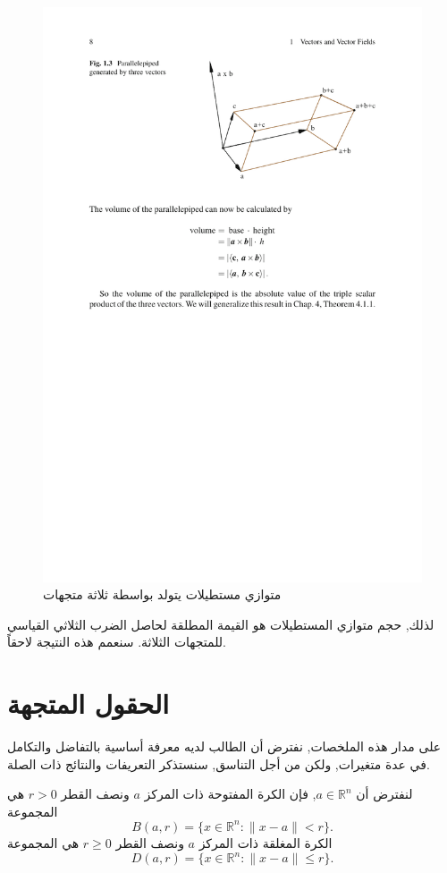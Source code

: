 \begin{figure}
    \centering
    \includegraphics[width=0.5\linewidth]{Parallelepiped.pdf}
    \caption{متوازي مستطيلات يتولد بواسطة ثلاثة متجهات}
    \label{fig:enter-label}
\end{figure}

لذلك, حجم متوازي المستطيلات هو القيمة المطلقة لحاصل الضرب الثلاثي القياسي للمتجهات الثلاثة. سنعمم هذه النتيجة لاحقاً.
\newpage
\section{ الحقول المتجهة}

على مدار هذه الملخصات, نفترض أن الطالب لديه معرفة أساسية بالتفاضل والتكامل في عدة متغيرات, ولكن من أجل التناسق, سنستذكر التعريفات والنتائج ذات الصلة.

\begin{definition}
لنفترض أن \(a \in \mathbb{R}^n\), فإن الكرة المفتوحة ذات المركز \(a\) ونصف القطر \(r > 0\) هي المجموعة
\[ B(a, r) = \{x \in \mathbb{R}^n : \|x - a\| < r\}. \]
الكرة المغلقة ذات المركز \(a\) ونصف القطر \(r \geq 0\) هي المجموعة
\[ 
D(a, r) = \{x \in \mathbb{R}^n : \|x - a\| \leq r\}. 
\]
\end{definition}

